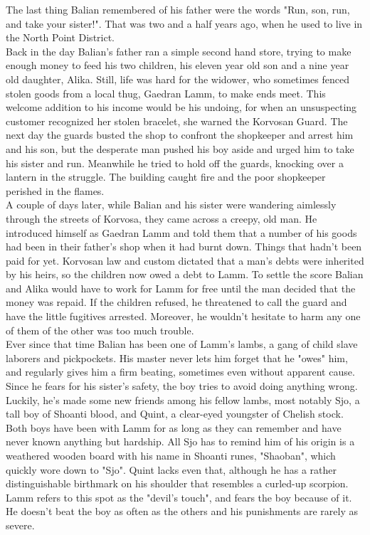 The last thing Balian remembered of his father were the words "Run, son, run, and take your sister!". That was two and a half years ago, when he used to live in the North Point District.\\

Back in the day Balian's father ran a simple second hand store, trying to make enough money to feed his two children, his eleven year old son and a nine year old daughter, Alika. Still, life was hard for the widower, who sometimes fenced stolen goods from a local thug, Gaedran Lamm, to make ends meet. This welcome addition to his income would be his undoing, for when an unsuspecting customer recognized her stolen bracelet, she warned the Korvosan Guard. The next day the guards busted the shop to confront the shopkeeper and arrest him and his son, but the desperate man pushed his boy aside and urged him to take his sister and run. Meanwhile he tried to hold off the guards, knocking over a lantern in the struggle. The building caught fire and the poor shopkeeper perished in the flames.\\

A couple of days later, while Balian and his sister were wandering aimlessly through the streets of Korvosa, they came across a creepy, old man. He introduced himself as Gaedran Lamm and told them that a number of his goods had been in their father's shop when it had burnt down. Things that hadn't been paid for yet. Korvosan law and custom dictated that a man's debts were inherited by his heirs, so the children now owed a debt to Lamm. To settle the score Balian and Alika would have to work for Lamm for free until the man decided that the money was repaid. If the children refused, he threatened to call the guard and have the little fugitives arrested. Moreover, he wouldn't hesitate to harm any one of them of the other was too much trouble.\\

Ever since that time Balian has been one of Lamm's lambs, a gang of child slave laborers and pickpockets. His master never lets him forget that he "owes" him, and regularly gives him a firm beating, sometimes even without apparent cause. Since he fears for his sister's safety, the boy tries to avoid doing anything wrong.\\

Luckily, he's made some new friends among his fellow lambs, most notably Sjo, a tall boy of Shoanti blood, and Quint, a clear-eyed youngster of Chelish stock. Both boys have been with Lamm for as long as they can remember and have never known anything but hardship. All Sjo has to remind him of his origin is a weathered wooden board with his name in Shoanti runes, "Shaoban", which quickly wore down to "Sjo". Quint lacks even that, although he has a rather distinguishable birthmark on his shoulder that resembles a curled-up scorpion. Lamm refers to this spot as the "devil's touch", and fears the boy because of it. He doesn't beat the boy as often as the others and his punishments are rarely as severe.\\

